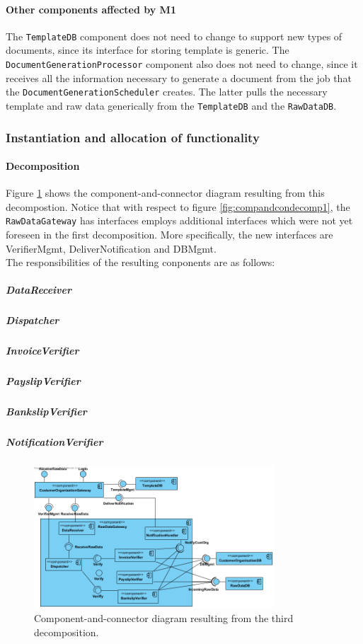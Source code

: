 \documentclass[a4paper,10pt]{article}
\begin{document}
\paragraph{Other components affected by M1}
The \texttt{TemplateDB} component does not need to change to support new types of documents, since its interface for storing template is generic. The \texttt{DocumentGenerationProcessor} component also does not need to change, since it receives all the information necessary to generate a document from the job that the \texttt{DocumentGenerationScheduler} creates. The latter pulls the necessary template and raw data generically from the \texttt{TemplateDB} and the \texttt{RawDataDB}.
\subsubsection{Instantiation and allocation of functionality}
\paragraph{Decomposition}
Figure \ref{fig:compandcondecomp3} shows the component-and-connector diagram resulting from this decompostion. Notice that with respect to figure  \ref{fig:compandcondecomp1}, the \texttt{RawDataGateway} has interfaces employs additional interfaces which were not yet foreseen in the first decomposition. More specifically, the new interfaces are VerifierMgmt, DeliverNotification and DBMgmt.\\
The responsibilities of the resulting conponents are as follows:
\subparagraph{DataReceiver}


\subparagraph{Dispatcher}

\subparagraph{InvoiceVerifier}

\subparagraph{PayslipVerifier}

\subparagraph{BankslipVerifier}

\subparagraph{NotificationVerifier}

\begin{figure}[!htp]
	\centering
	\includegraphics[width=0.8\textwidth]{RawDataGateway.png}
	\caption{Component-and-connector diagram resulting from the third decomposition.
	}\label{fig:compandcondecomp3}
\end{figure}
\end{document}

